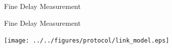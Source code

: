 \documentclass[compress,red]{beamer}
\begin{document}
\subsection{}
% 
% 
% 
\logo{}
\begin{frame}{Fine Delay Measurement}


\end{frame}
\begin{frame}{Fine Delay Measurement}

  \begin{center}
  \texttt{[image: ../../figures/protocol/link\_model.eps]}
  \end{center}

\end{frame}
\end{document}
